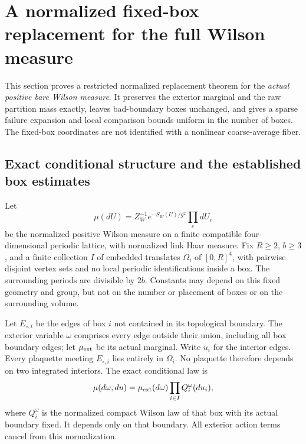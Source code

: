 \documentclass[11pt]{article}
\theoremstyle{remark}
\begin{document}
\section{A normalized fixed-box replacement for the full Wilson measure}
\label{nbr-section}

This section proves a restricted normalized replacement theorem for the
\emph{actual positive bare Wilson measure}. It preserves the exterior
marginal and the raw partition mass exactly, leaves bad-boundary boxes
unchanged, and gives a sparse failure expansion and local comparison
bounds uniform in the number of boxes. The fixed-box coordinates are
not identified with a nonlinear coarse-average fiber.

\subsection{Exact conditional structure and the established box estimates}
\label{nbr-input-section}

Let
\[
 \mu(dU)=Z_W^{-1}e^{-S_W(U)/g^2}\prod_e dU_e
\]
be the normalized positive Wilson measure on a finite compatible
four-dimensional periodic lattice, with normalized link Haar measure.
Fix \(R\ge2\), \(b\ge3\), and a finite collection \(I\) of embedded
translates \(\Omega_i\) of \([0,R]^4\), with pairwise disjoint vertex
sets and no local periodic identifications inside a box. The surrounding
periods are divisible by \(2b\). Constants may depend on this fixed
geometry and group, but not on the number or placement of boxes or on
the surrounding volume.

Let \(E_{\circ,i}\) be the edges of box \(i\) not contained in its
topological boundary. The exterior variable \(\omega\) comprises every
edge outside their union, including all box boundary edges; let
\(\mu_{\rm ext}\) be its actual marginal. Write \(u_i\) for the
interior edges. Every plaquette meeting \(E_{\circ,i}\) lies entirely
in \(\Omega_i\). No plaquette therefore depends on two integrated
interiors. The exact conditional law is
\begin{equation}
 \mu(d\omega,du)=\mu_{\rm ext}(d\omega)
                    \prod_{i\in I}Q_i^\omega(du_i),
 \label{nbr-disintegration}
\end{equation}
where \(Q_i^\omega\) is the normalized compact Wilson law of that box
with its actual boundary fixed. It depends only on that boundary.
All exterior action terms cancel from this normalization.
\end{document}
